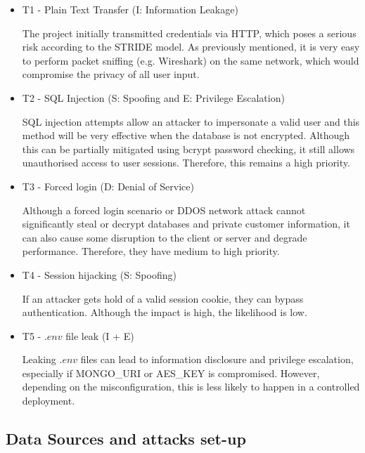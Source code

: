 \documentclass{article}
\begin{document}
\begin{itemize}
    \item T1 - Plain Text Transfer (I: Information Leakage)
    
    The project initially transmitted credentials via HTTP, which poses a serious risk according to the STRIDE model. As previously mentioned, it is very easy to perform packet sniffing (e.g. Wireshark) on the same network, which would compromise the privacy of all user input.
    
    \item T2 - SQL Injection (S: Spoofing and E: Privilege Escalation)
    
    SQL injection attempts allow an attacker to impersonate a valid user and this method will be very effective when the database is not encrypted. Although this can be partially mitigated using bcrypt password checking, it still allows unauthorised access to user sessions. Therefore, this remains a high priority.
    
    \item T3 - Forced login (D: Denial of Service)
    
    Although a forced login scenario or DDOS network attack cannot significantly steal or decrypt databases and private customer information, it can also cause some disruption to the client or server and degrade performance. Therefore, they have medium to high priority.
    
    \item T4 - Session hijacking (S: Spoofing)
    
    If an attacker gets hold of a valid session cookie, they can bypass authentication. Although the impact is high, the likelihood is low.
    
    \item T5 - $.env$ file leak (I + E)
    
    Leaking $.env$ files can lead to information disclosure and privilege escalation, especially if MONGO\_URI or AES\_KEY is compromised. However, depending on the misconfiguration, this is less likely to happen in a controlled deployment.
    
\end{itemize}


\subsection{Data Sources and attacks set-up}
\end{document}
